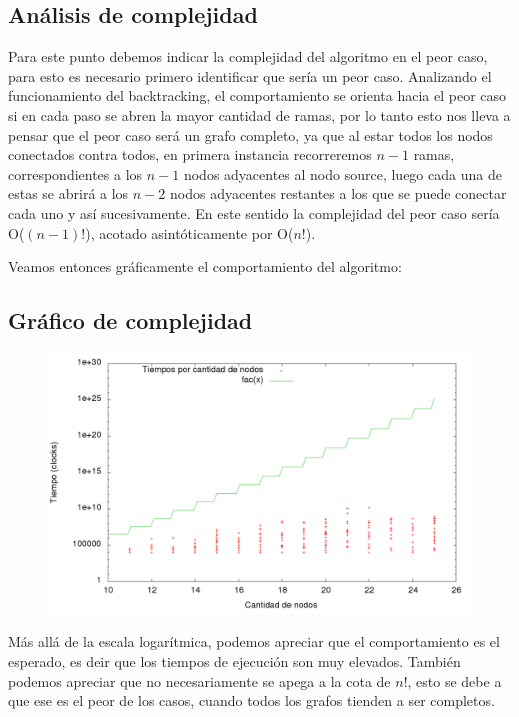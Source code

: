 \newpage
\subsection{An\'alisis de complejidad}

Para este punto debemos indicar la complejidad del algoritmo en el peor caso, para esto es necesario primero identificar que ser\'ia un peor caso.
Analizando el funcionamiento del backtracking, el comportamiento se orienta hacia el peor caso si en cada paso se abren la mayor cantidad de ramas, por lo tanto esto nos lleva a pensar que el peor caso ser\'a un grafo completo, ya que al estar todos los nodos conectados contra todos, en primera instancia recorreremos $n-1$ ramas, correspondientes a los $n-1$ nodos adyacentes al nodo source, luego cada una de estas se abrir\'a a los $n-2$ nodos adyacentes restantes a los que se puede conectar cada uno y as\'i sucesivamente. En este sentido la complejidad del peor caso ser\'ia O($(n-1)!$), acotado asint\'oticamente por O($n!$).

Veamos entonces gr\'aficamente el comportamiento del algoritmo:

\subsection{Gr\'afico de complejidad}
\begin{figure}[!hp]
	\centering
 	\includegraphics[scale=0.3]{img/exacto_time.png}
\end{figure}

M\'as all\'a de la escala logar\'itmica, podemos apreciar que el comportamiento es el esperado, es deir que los tiempos de ejecuci\'on son muy elevados.
Tambi\'en podemos apreciar que no necesariamente se apega a la cota de $n!$, esto se debe a que ese es el peor de los casos, cuando todos los grafos tienden a ser completos.


